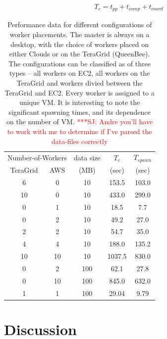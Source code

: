 \documentclass[conference,final]{IEEEtran}
\newcommand{\jhanote}[1]{ {\textcolor{red} { ***SJ: #1 }}}
\newcommand{\jhanote}[1]{}
\newcommand{\upp}{\vspace*{-0.5em}}
\begin{document}
\vspace{-1em}
\begin{eqnarray}
T_c = t_{pp} + t_{comp} + t_{coord}
\end{eqnarray}



\begin{table}
\upp
\begin{tabular}{ccccc}
  \hline
  \multicolumn{2}{c}{Number-of-Workers}  &  data size   &  $T_c$  & $T_{spawn}$ \\   
  TeraGrid &  AWS &   (MB)  & (sec) & (sec)  \\
  \hline
  6 & 0 & 10   &  153.5 & 103.0  \\
  10 & 0 & 10  &  433.0  & 299.0 \\
  \hline 
  0 & 1 & 10 & 18.5 & 7.7 \\
  0 & 2 & 10 &  49.2 & 27.0 \\
  \hline 
  2 & 2 & 10 & 54.7 & 35.0 \\
  4 & 4 &10 & 188.0 & 135.2 \\
  10 & 10 & 10 & 1037.5 & 830.0 \\
  \hline
  \hline 
  0 & 2 & 100 & 62.1 & 27.8 \\
  0 & 10 & 100 &  845.0 & 632.0 \\
  1 & 1 & 100 & 29.04 & 9.79 \\

  \hline \hline
\end{tabular}
\upp
\caption{Performance data for different configurations of worker placements. The master is always on a desktop, with the choice of workers placed on either Clouds or on the TeraGrid (QueenBee). The configurations can be classified
  as of three types -- all workers on EC2, all workers on the TeraGrid and workers divied between the TeraGrid and EC2. Every worker is assigned to a unique
  VM. It is interesting to note the significant
  spawning times, and its dependence on the number of VM. \jhanote{Andre you'll have to work with me to determine if I've parsed the data-files correctly} }
\label{stuff}
\upp
\upp
\end{table}

\section{Discussion}
\end{document}
